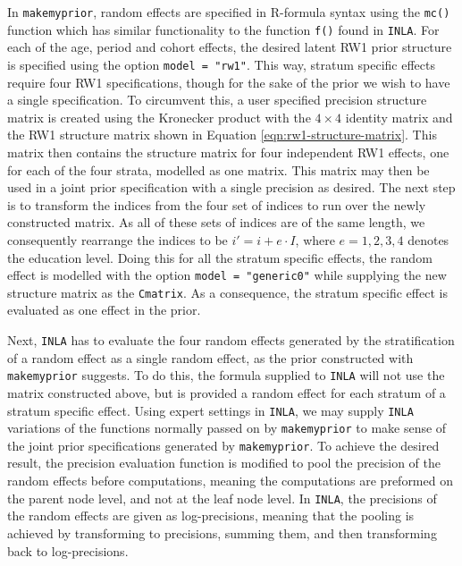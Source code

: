 In \texttt{makemyprior}, random effects are specified in R-formula syntax using the \texttt{mc()} function which has similar functionality to the function \texttt{f()} found in \texttt{INLA}. For each of the age, period and cohort effects, the desired latent RW1 prior structure is specified using the option \texttt{model = "rw1"}. This way, stratum specific effects require four RW1 specifications, though for the sake of the prior we wish to have a single specification. To circumvent this, a user specified precision structure matrix is created using the Kronecker product with the $4\times 4$ identity matrix and the RW1 structure matrix shown in Equation \eqref{eqn:rw1-structure-matrix}. This matrix then contains the structure matrix for four independent RW1 effects, one for each of the four strata, modelled as one matrix. This matrix may then be used in a joint prior specification with a single precision as desired. The next step is to transform the indices from the four set of indices to run over the newly constructed matrix. As all of these sets of indices are of the same length, we consequently rearrange the indices to be $i'=i + e\cdot I$, where $e=1,2,3,4$ denotes the education level. Doing this for all the stratum specific effects, the random effect is modelled with the option \texttt{model = "generic0"} while supplying the new structure matrix as the \texttt{Cmatrix}. As a consequence, the stratum specific effect is evaluated as one effect in the prior. 

Next, \texttt{INLA} has to evaluate the four random effects generated by the stratification of a random effect as a single random effect, as the prior constructed with \texttt{makemyprior} suggests. To do this, the formula supplied to \texttt{INLA} will not use the matrix constructed above, but is provided a random effect for each stratum of a stratum specific effect. Using expert settings in \texttt{INLA}, we may supply \texttt{INLA} variations of the functions normally passed on by \texttt{makemyprior} to make sense of the joint prior specifications generated by \texttt{makemyprior}. To achieve the desired result, the precision evaluation function is modified to pool the precision of the random effects before computations, meaning the computations are preformed on the parent node level, and not at the leaf node level. In \texttt{INLA}, the precisions of the random effects are given as log-precisions, meaning that the pooling is achieved by transforming to precisions, summing them, and then transforming back to log-precisions. 

